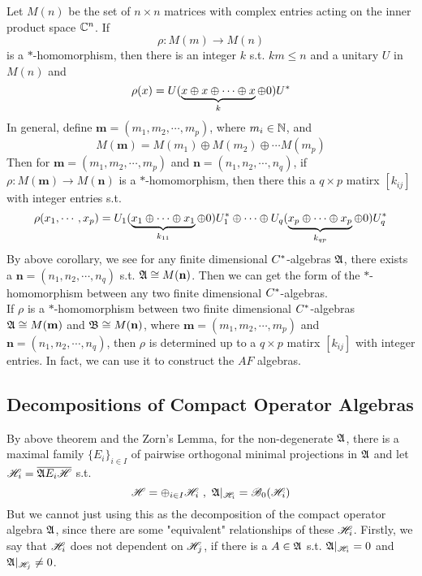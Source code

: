 \documentclass[a4paper,11pt]{report}
\begin{document}
\begin{exam}
	Let $M(n)$ be the set of $n \times n$ matrices with complex entries acting on the inner product space $\mathbb{C}^{n}$. If
	\begin{equation*}
		\rho \colon M(m) \longrightarrow M(n)
	\end{equation*}
	is a $*$-homomorphism, then there is an integer $k$ s.t. $km \leqslant n$ and a unitary $U$ in $M(n)$ and 
	\begin{equation*}
		\rho(x) = U(\underbrace{x \oplus x \oplus \cdots \oplus x}_k \oplus 0)U^{*}
	\end{equation*}
	In general, define $\mathbf{m} = (m_1, m_2, \cdots, m_p)$, where $m_i \in \mathbb{N}$, and
	\begin{equation*}
		M(\mathbf{m}) = M(m_1) \oplus M(m_2) \oplus \cdots M(m_p)
	\end{equation*}
	Then for $\mathbf{m} = (m_1, m_2, \cdots, m_p)$ and $\mathbf{n}=(n_1, n_2, \cdots, n_q)$, if $\rho \colon M(\mathbf{m}) \rightarrow M(\mathbf{n})$ is a $*$-homomorphism, then there this a $q \times p$ matirx $[k_{ij}]$ with integer entries s.t.
	\begin{equation*}
		\rho(x_1,\cdots,x_p) = U_1(\underbrace{x_1 \oplus \cdots \oplus x_1}_{k_{11}} \oplus 0)U^{*}_1 \oplus \cdots \oplus U_q(\underbrace{x_p \oplus \cdots \oplus x_p}_{k_{qp}} \oplus 0)U^{*}_q
	\end{equation*}
	By above corollary, we see for any finite dimensional $C^{*}$-algebras $\mathfrak{A}$, there exists a $\mathbf{n}=(n_1, n_2, \cdots, n_q)$ s.t. $\mathfrak{A} \cong M(\mathbf{n})$. Then we can get the form of the $*$-homomorphism between any two finite dimensional $C^{*}$-algebras. \\
	If $\rho$ is a $*$-homomorphism between two finite dimensional $C^{*}$-algebras\\ $\mathfrak{A} \cong M(\mathbf{m})$ and $\mathfrak{B} \cong M(\mathbf{n})$, where $\mathbf{m} = (m_1, m_2, \cdots, m_p)$ and $\mathbf{n}=(n_1, n_2, \cdots, n_q)$, then $\rho$ is determined up to a $q \times p$ matirx $[k_{ij}]$ with integer entries. In fact, we can use it to construct the $AF$ algebras.
\end{exam}

\subsection{Decompositions of Compact Operator Algebras}

By above theorem and the Zorn's Lemma, for the non-degenerate $\mathfrak{A}$, there is a maximal family $\{E_i\}_{i \in I}$ of pairwise orthogonal minimal projections in $\mathfrak{A}$ and let $\mathscr{H}_i = \overline{\mathfrak{A} E_i \mathscr{H}}$ s.t.
\begin{equation*}
	\mathscr{H} = \oplus_{i \in I} \mathscr{H}_i~,~ \mathfrak{A}|_{\mathscr{H}_i} = \mathscr{B}_0(\mathscr{H}_i)
\end{equation*}
But we cannot just using this as the decomposition of the compact operator algebra $\mathfrak{A}$, since there are some "equivalent" relationships of these $\mathscr{H}_i$. Firstly, we say that $\mathscr{H}_i$ does not dependent on $\mathscr{H}_j$, if there is a $A \in \mathfrak{A}$ s.t. $\mathfrak{A}|_{\mathscr{H}_i} = 0$ and $\mathfrak{A}|_{\mathscr{H}_j} \neq 0$.
\end{document}
